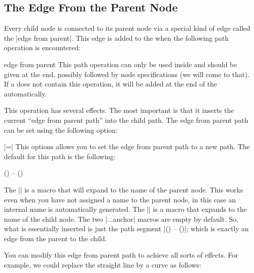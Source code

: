 \subsection{The Edge From the Parent Node}

\label{section-edge-from-parent}

Every child node is connected to its parent node via a special kind of
edge called the |edge from parent|. This edge is added to the
 when the following path operation is encountered:

\begin{pathoperation}{edge from parent}{}
  This path operation can only be used inside  and
  should be given at the end, possibly followed by node specifications
  (we will come to that). If a  does not contain this
  operation, it will be added at the end of the 
  automatically.

  This operation has several effects. The most important is that it
  inserts the current ``edge from parent path'' into the child
  path. The edge from parent path can be set using the following
  option:
  \begin{itemize}
    |=|
    This options allows you to set the edge from parent path to a new
    path. The default for this path is the following:
    \begin{codeexample}
(\tikzparentnode\tikzparentanchor) -- (\tikzchildnode\tikzchildanchor)      
    \end{codeexample}
    The |\tikzparentnode| is a macro that will expand to the name of
    the parent node. This works even when you have not assigned a name
    to the parent node, in this case an internal name is automatically
    generated. The |\tikzchildnode| is a macro that expands to the
    name of the child node. The two |...anchor| macros are empty by
    default. So, what is essentially inserted is just the path segment
    |(\tikzparentnode) -- (\tikzchildnode)|; which is exactly an edge
    from the parent to the child.

    You can modify this edge from parent path to achieve all sorts of
    effects. For example, we could replace the straight line by a
    curve as follows:
\begin{codeexample}[]
\end{codeexample}


\end{itemize}
\end{pathoperation}
